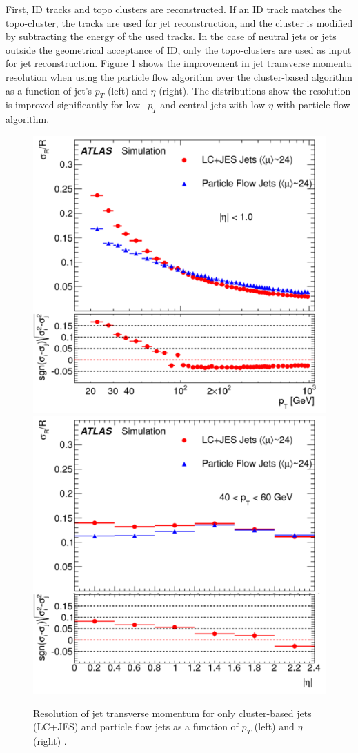 First, ID tracks and topo clusters are reconstructed. If an ID track matches the topo-cluster, the tracks are used for jet reconstruction, and the cluster is modified by subtracting the energy of the used tracks. In the case of neutral jets or jets outside the geometrical acceptance of ID, only the topo-clusters are used as input for jet reconstruction. Figure \ref{fig:PflowvsCalo} shows the improvement in jet transverse momenta resolution when using the particle flow algorithm over the cluster-based algorithm as a function of jet's $p_{T}$ (left) and $\eta$ (right). The distributions show the resolution is improved significantly for low$-p_{T}$ and central jets with low $\eta$ with particle flow algorithm.

\begin{figure}
    \centering
    \includegraphics[width=.48\linewidth]{figures/LHC/Pflow_vs_Calo_pt.pdf}
    \includegraphics[width=.48\linewidth]{figures/LHC/Pflow_vs_Calo_eta.pdf}
    \caption{ Resolution of jet transverse momentum for only cluster-based jets (LC+JES) and particle flow jets as a function of $p_{T}$ (left) and $\eta$ (right) \cite{ParticleFlow}.\label{fig:PflowvsCalo}}
\end{figure}

